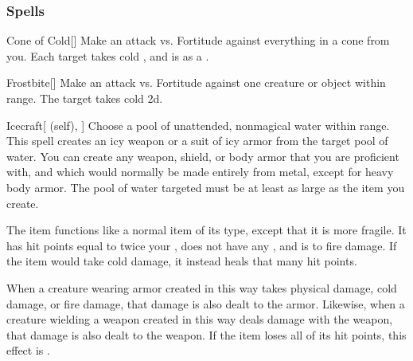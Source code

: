 \subsubsection{Spells}


\lowercase{\hypertarget{spell:Cone of Cold}{}}\label{spell:Cone of Cold}
\begin{apability}[\nth{1}]{\hypertarget{spell:Cone of Cold}{Cone of Cold}}[]
Make an attack vs. Fortitude against everything in a \areamed cone from you.
\hit Each target takes cold , and is  as a .
\end{apability}
\vspace{0.25em}



\lowercase{\hypertarget{spell:Frostbite}{}}\label{spell:Frostbite}
\begin{apability}[\nth{1}]{\hypertarget{spell:Frostbite}{Frostbite}}[]
Make an attack vs. Fortitude against one creature or object within \rngmed range.
\hit The target takes cold  \plus2d.
\end{apability}
\vspace{0.25em}



\lowercase{\hypertarget{spell:Icecraft}{}}\label{spell:Icecraft}
\begin{attuneability}[\nth{1}]{\hypertarget{spell:Icecraft}{Icecraft}}[ (self), ]
Choose a pool of unattended, nonmagical water within \rngclose range.
This spell creates an icy weapon or a suit of icy armor from the target pool of water.
You can create any weapon, shield, or body armor that you are proficient with, and which would normally be made entirely from metal, except for heavy body armor.
The pool of water targeted must be at least as large as the item you create.

The item functions like a normal item of its type, except that it is more fragile.
It has hit points equal to twice your , does not have any , and is  to fire damage.
If the item would take cold damage, it instead heals that many hit points.

When a creature wearing armor created in this way takes physical damage, cold damage, or fire damage, that damage is also dealt to the armor.
Likewise, when a creature wielding a weapon created in this way deals damage with the weapon, that damage is also dealt to the weapon.
If the item loses all of its hit points, this effect is .
\end{attuneability}
\vspace{0.25em}




